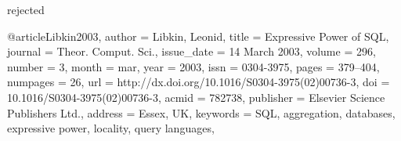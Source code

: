 
\cite{Monteleone2013} rejected

\cite{Libkin2001}

@article{Libkin2003,
 author = {Libkin, Leonid},
 title = {Expressive Power of SQL},
 journal = {Theor. Comput. Sci.},
 issue_date = {14 March 2003},
 volume = {296},
 number = {3},
 month = mar,
 year = {2003},
 issn = {0304-3975},
 pages = {379--404},
 numpages = {26},
 url = {http://dx.doi.org/10.1016/S0304-3975(02)00736-3},
 doi = {10.1016/S0304-3975(02)00736-3},
 acmid = {782738},
 publisher = {Elsevier Science Publishers Ltd.},
 address = {Essex, UK},
 keywords = {SQL, aggregation, databases, expressive power, locality, query languages},
} 


\cite{Liang2011}

\cite{Bollacker2008}